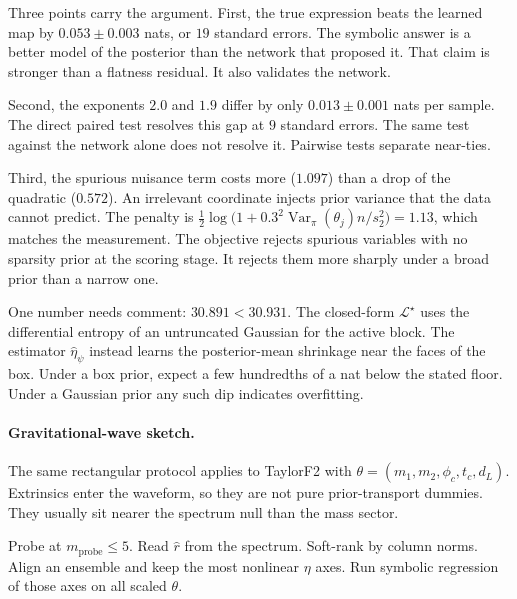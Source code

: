 \documentclass[11pt, letterpaper]{article}
\theoremstyle{definition}
\begin{document}
Three points carry the argument.
First, the true expression beats the learned map by $0.053\pm0.003$ nats, or
$19$ standard errors.
The symbolic answer is a better model of the posterior than the network that
proposed it. That claim is stronger than a flatness residual.
It also validates the network.

Second, the exponents $2.0$ and $1.9$ differ by only $0.013\pm0.001$ nats per
sample. The direct paired test resolves this gap at $9$ standard errors.
The same test against the network alone does not resolve it.
Pairwise tests separate near-ties.

Third, the spurious nuisance term costs more ($1.097$) than a drop of the
quadratic ($0.572$). An irrelevant coordinate injects prior variance that the
data cannot predict. The penalty is
$\tfrac12\log\bigl(1+0.3^2\operatorname{Var}_\pi(\theta_j)n/s_2^2\bigr)=1.13$,
which matches the measurement.
The objective rejects spurious variables with no sparsity prior at the scoring
stage. It rejects them more sharply under a broad prior than a narrow one.

One number needs comment: $30.891<30.931$.
The closed-form $\mathcal{L}^\star$ uses the differential entropy of an
untruncated Gaussian for the active block.
The estimator $\hat\eta_\psi$ instead learns the posterior-mean shrinkage near
the faces of the box. Under a box prior, expect a few hundredths of a nat below
the stated floor. Under a Gaussian prior any such dip indicates overfitting.

\paragraph{Gravitational-wave sketch.}
The same rectangular protocol applies to TaylorF2 with
$\theta=(m_1,m_2,\phi_c,t_c,d_L)$.
Extrinsics enter the waveform, so they are not pure prior-transport dummies.
They usually sit nearer the spectrum null than the mass sector.

Probe at $m_{\mathrm{probe}}\le 5$.
Read $\hat r$ from the spectrum.
Soft-rank by column norms.
Align an ensemble and keep the most nonlinear $\eta$ axes.
Run symbolic regression of those axes on all scaled $\theta$.




\end{document}
